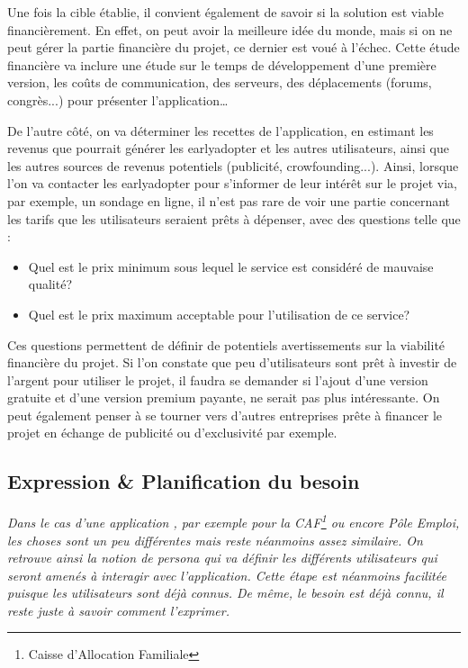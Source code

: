 Une fois la cible établie, il convient également de savoir si la solution est viable financièrement. En effet, on peut avoir la meilleure idée du monde, mais si on ne peut gérer la partie financière du projet, ce dernier est voué à l'échec. Cette étude financière va inclure une étude sur le temps de développement d'une première version, les coûts de communication, des serveurs, des déplacements (forums, congrès...) pour présenter l'application\ldots

De l'autre côté, on va déterminer les recettes de l'application, en estimant les revenus que pourrait générer les \gls{earlyadopter} et les autres utilisateurs, ainsi que les autres sources de revenus potentiels (publicité, crowfounding...). Ainsi, lorsque l'on va contacter les \gls{earlyadopter} pour s'informer de leur intérêt sur le projet via, par exemple, un sondage en ligne, il n'est pas rare de voir une partie concernant les tarifs que les utilisateurs seraient prêts à dépenser, avec des questions telle que :

\begin{itemize}
	\setlength\itemsep{-0.5em}
	\item Quel est le prix minimum sous lequel le service est considéré de mauvaise qualité?
	\item Quel est le prix maximum acceptable pour l'utilisation de ce service?
\end{itemize}

Ces questions permettent de définir de potentiels avertissements sur la viabilité financière du projet. Si l'on constate que peu d'utilisateurs sont prêt à investir de l'argent pour utiliser le projet, il faudra se demander si l'ajout d'une version gratuite et d'une version premium payante, ne serait pas plus intéressante. On peut également penser à se tourner vers d'autres entreprises prête à financer le projet en échange de publicité ou d'exclusivité par exemple.

\subsection{Expression \& Planification du besoin}

{\em 
Dans le cas d'une application , par exemple pour la CAF\footnote{Caisse d'Allocation Familiale} ou encore Pôle Emploi, les choses sont un peu différentes mais reste néanmoins assez similaire. On retrouve ainsi la notion de \gls{persona} qui va définir les différents utilisateurs qui seront amenés à interagir avec l'application. Cette étape est néanmoins facilitée puisque les utilisateurs sont déjà connus. De même, le besoin est déjà connu, il reste juste à savoir comment l'exprimer.
}

